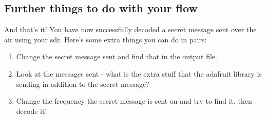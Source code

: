 \subsection{Further things to do with your flow}
And that's it! You have now successfully decoded a secret message sent over the air using your \gls{sdr}. Here's some extra things you can do in pairs:
\begin{enumerate}
\item Change the secret message sent and find that in the output file.
\item Look at the messages sent - what is the extra stuff that the adafruit library is sending in addition to the secret message?
\item Change the frequency the secret message is sent on and try to find it, then decode it!

\end{enumerate}